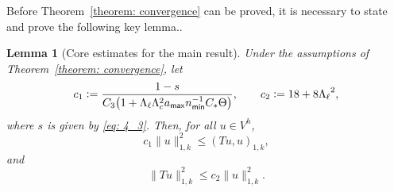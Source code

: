 \documentclass[numbers,webpdf,imaiai]{ima-authoring-template}%
\theoremstyle{thmstyletwo}%
\newtheorem{lemma}[theorem]{Lemma}
\numberwithin{equation}{section}
\newcommand{\Cstar}{C_{\ast}}
\newcommand{\assign}{\mathrel{\mathop:}=}
\numberwithin{equation}{section}
\newcommand{\amax}{a_{\textup{\textsf{max}}}}
\newcommand{\nmin}{n_{\textup{\textsf{min}}}}
\begin{document}
{Before Theorem~\ref{theorem: convergence} can be proved, it is necessary to state and prove the following key lemma..

\begin{lemma}[Core estimates for the main result] \label{ther: 4_1}
Under the assumptions of Theorem~\ref{theorem: convergence}, let 
\begin{equation*}
	c_1 \assign
	\frac{1-s}{C_3\bigl(1 + \Lambda_\ell \Lambda_c^2 \amax {\nmin^{-1} \Cstar } \Theta \bigr)},
	\qquad
	c_2 \assign 18 + 8 {\Lambda_{\ell}}^2, 
\end{equation*}
where $s$ is given by \eqref{eq: 4_3}.  Then, for all $u \in V^h$,
\begin{equation}
	c_1\|u\|_{1,k}^2 \le (Tu,u)_{1,k},
	\label{eq: 4_4}
\end{equation}
and
\begin{equation}
	\|Tu\|_{1,k}^2 \le c_2 \|u\|_{1,k}^2.
	\label{eq: 4_5}
\end{equation}
\end{lemma}

}
\end{document}
